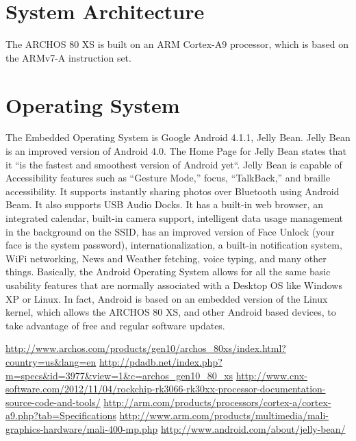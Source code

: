 \documentclass{article}
\begin{document}



\section*{ System Architecture }
The ARCHOS 80 XS is built on an ARM Cortex-A9 processor, which is based on the ARMv7-A instruction set.

\section*{ Operating System }
The Embedded Operating System is Google Android 4.1.1, Jelly Bean. Jelly Bean is an improved version of Android 4.0. The Home Page for Jelly Bean states that it ``is the fastest and smoothest version of Android yet``. \cite{JellyBean} Jelly Bean is capable of Accessibility features such as ``Gesture Mode,'' focus, ``TalkBack,'' and braille accessibility. It supports instantly sharing photos over Bluetooth using Android Beam. It also supports USB Audio Docks. It has a built\--in web browser, an integrated calendar, built\--in camera support, intelligent data usage management in the background on the SSID, has an improved version of Face Unlock (your face is the system password), internationalization, a built\--in notification system, WiFi networking, News and Weather fetching, voice typing, and many other things. Basically, the Android Operating System allows for all the same basic usability features that are normally associated with a Desktop OS like Windows XP or Linux. In fact, Android is based on an embedded version of the Linux kernel, which allows the ARCHOS 80 XS, and other Android based devices, to take advantage of free and regular software updates.   

\newpage
\begin{thebibliography}{1}
		\url{http://www.archos.com/products/gen10/archos_80xs/index.html?country=us&lang=en}
		\url{http://pdadb.net/index.php?m=specs&id=3977&view=1&c=archos_gen10_80_xs}
		\url{http://www.cnx-software.com/2012/11/04/rockchip-rk3066-rk30xx-processor-documentation-source-code-and-tools/}
		\url{http://arm.com/products/processors/cortex-a/cortex-a9.php?tab=Specifications}
		\url{http://www.arm.com/products/multimedia/mali-graphics-hardware/mali-400-mp.php}
		\url{http://www.android.com/about/jelly-bean/}
\end{thebibliography}


\label{end}
\end{document}
